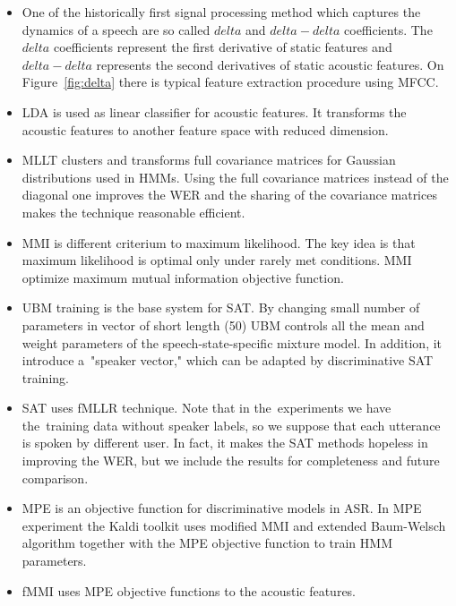 \begin{itemize}
    \item One of the historically first signal processing method which captures the dynamics of a speech
        are so called $delta$ and $delta-delta$ coefficients. The~$delta$ coefficients represent the first 
        derivative of static features and $delta-delta$ represents the second derivatives of static acoustic features.
        On Figure~\ref{fig:delta} there is typical feature extraction procedure using \ac{MFCC}\cite{ye2004speech}.
    \item \ac{LDA} is used as linear classifier for acoustic features. 
        It transforms the acoustic features to another feature space with reduced dimension.
    \item \ac{MLLT}\cite{psutka2007benefit} clusters and transforms full covariance matrices for Gaussian distributions used in \ac{HMM}s. Using the full covariance matrices instead of the diagonal one improves the \ac{WER} and the sharing of the covariance matrices makes the technique reasonable efficient.
    \item \ac{MMI} is different criterium to maximum likelihood. The key idea is that maximum likelihood is optimal only under rarely met conditions. \ac{MMI} optimize maximum mutual information objective function\cite{chow1990maximum}.
    \item \ac{UBM}\cite{povey2010subspace} training is the base system for \acl{SAT}. 
        By changing small number of parameters in vector of short length (50) \ac{UBM} controls all the mean and 
        weight parameters of the speech-state-specific mixture model. In addition, it introduce 
        a~"speaker vector," which can be adapted by discriminative \ac{SAT} training.
    \item \acl{SAT}\cite{povey2011kaldi} uses \ac{fMLLR} technique. Note that in the~experiments we have 
        the~training data without speaker labels, so we suppose that each utterance is spoken by different user.
        In fact, it makes the \ac{SAT} methods hopeless in improving the \ac{WER}, 
        but we include the results for completeness and future comparison.
    \item \ac{MPE}\cite{povey2007evaluation} is an objective function for discriminative models in \ac{ASR}. In \ac{MPE} experiment the Kaldi toolkit uses modified \ac{MMI} and extended Baum-Welsch algorithm together with the \ac{MPE} objective function to train \ac{HMM} parameters.
    \item \cite{povey2005fmpe} \ac{fMMI} uses \ac{MPE} objective functions to the acoustic features.
\end{itemize}
